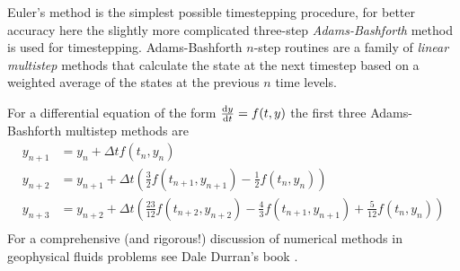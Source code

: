 \documentclass[a4paper]{tufte-handout}
\begin{document}
  Euler's method is the simplest possible timestepping procedure,
  for better accuracy here the slightly more complicated three-step \emph{Adams-Bashforth}
  method is used for timestepping.  Adams-Bashforth $n$-step routines are a family
  of \emph{linear multistep} methods that calculate the state at the next timestep
  based on a weighted average of the states at the previous $n$ time levels.

  For a differential equation of the form $ \frac{\operatorname{d}\!{} y}{\operatorname{d}\!{t}} = f(t, y) $ the
  first three Adams-Bashforth multistep methods are
  \begin{align*}
    y_{n+1} &= y_n + \Delta t f(t_n, y_n)  \\
    y_{n+2} &= y_{n+1} + \Delta t \left( \frac{3}{2}f(t_{n+1}, y_{n+1}) - \frac{1}{2}f(t_n, y_n) \right) \\
    y_{n+3} &= y_{n+2} + \Delta t \left( \frac{23}{12} f(t_{n+2}, y_{n+2}) - \frac{4}{3} f(t_{n+1}, y_{n+1}) + \frac{5}{12}f(t_n, y_n)\right) \\
  \end{align*}
  For a comprehensive (and rigorous!) discussion of numerical methods in
  geophysical fluids problems see Dale Durran's book \cite{Durran:2010hy}.




\end{document}
